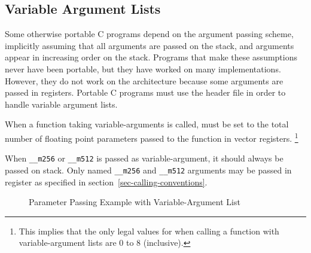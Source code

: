 \subsection{Variable Argument Lists}

Some otherwise portable C programs depend on the argument passing
scheme, implicitly assuming that all arguments are passed on the
stack, and arguments appear in increasing order on the stack.
Programs that make these assumptions never have been portable, but
they have worked on many implementations. However, they do not work on
the \xARCH architecture because some arguments are passed in
registers.  Portable C programs must use the header file
 in order to handle variable argument lists.

When a function taking variable-arguments is called, \RAX\index{\RAX}
must be set to the total number of floating point parameters passed to
the function in vector registers.%
\footnote{This implies that the only legal values for \RAX when
  calling a function with variable-argument lists are 0 to 8
  (inclusive).}

When \texttt{__m256} or \texttt{__m512} is passed as variable-argument,
it should always be passed on stack. Only named \texttt{__m256} and
\texttt{__m512} arguments may be passed in register as specified in
section~\ref{sec-calling-conventions}.

\begin{figure}[H]
\Hrule
\caption{Parameter Passing Example with Variable-Argument List}
\label{fig_va_passing_example}
\begin{center}
\end{center}
\Hrule
\end{figure}

